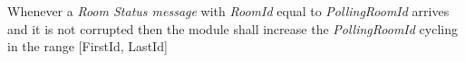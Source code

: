 \begin{req_enum}
\begin{req_enum}[label*=\arabic*.]
\begin{req_enum}[label*=\arabic*.]
							\item Whenever a \textit{Room Status message} with \textit{RoomId} equal to \textit{PollingRoomId} arrives and it is not corrupted then the module shall increase the \textit{PollingRoomId} cycling in the range [FirstId, LastId]
						\end{req_enum}
				\end{req_enum}	
		\end{req_enum}
